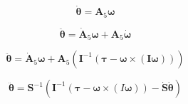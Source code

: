 \[
\dot{\boldsymbol\theta} = \mathbf{A}_5 \boldsymbol\omega
\]

\[
\ddot{\boldsymbol\theta} = \dot{\mathbf{A}}_5 \boldsymbol\omega + \mathbf{A}_5 \dot{\boldsymbol\omega}
\]

\[
\ddot{\boldsymbol\theta}
= \dot{\mathbf{A}}_5 \boldsymbol\omega
+ \mathbf{A}_5 \left(
	\mathbf{I}^{-1} \left( \boldsymbol\tau - \boldsymbol\omega \times \left( \mathbf{I} \boldsymbol\omega \right) \right)
\right)
\]

\begin{equation}
\ddot{\boldsymbol\theta} =
\mathbf{S}^{-1} \left(
	\mathbf{I}^{-1} \left( \boldsymbol\tau - \boldsymbol\omega \times \left( I \boldsymbol\omega \right) \right)
	- \dot{\mathbf{S}} \dot{\boldsymbol\theta}
\right)
\label{eq:eom_theta}
\end{equation}










